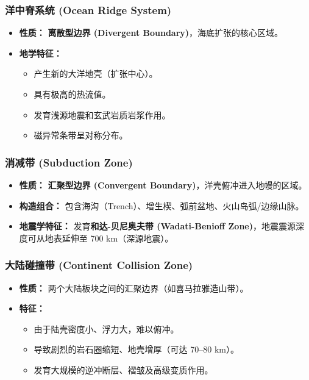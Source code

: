 \documentclass[12pt,a4paper]{article}
\begin{document}
	\subsubsection{洋中脊系统 (Ocean Ridge System)}
	\begin{itemize}
		\item \textbf{性质：} \textbf{离散型边界 (Divergent Boundary)}，海底扩张的核心区域。
		\item \textbf{地学特征：} 
		\begin{itemize}
			\item 产生新的大洋地壳（扩张中心）。
			\item 具有极高的热流值。
			\item 发育浅源地震和玄武岩质岩浆作用。
			\item 磁异常条带呈对称分布。
		\end{itemize}
	\end{itemize}
	
	\subsubsection{消减带 (Subduction Zone)}
	\begin{itemize}
		\item \textbf{性质：} \textbf{汇聚型边界 (Convergent Boundary)}，洋壳俯冲进入地幔的区域。
		\item \textbf{构造组合：} 包含海沟（Trench）、增生楔、弧前盆地、火山岛弧/边缘山脉。
		\item \textbf{地震学特征：} 发育\textbf{和达-贝尼奥夫带 (Wadati-Benioff Zone)}，地震震源深度可从地表延伸至 700 km（深源地震）。
	\end{itemize}
	
	\subsubsection{大陆碰撞带 (Continent Collision Zone)}
	\begin{itemize}
		\item \textbf{性质：} 两个大陆板块之间的汇聚边界（如喜马拉雅造山带）。
		\item \textbf{特征：} 
		\begin{itemize}
			\item 由于陆壳密度小、浮力大，难以俯冲。
			\item 导致剧烈的岩石圈缩短、地壳增厚（可达 70--80 km）。
			\item 发育大规模的逆冲断层、褶皱及高级变质作用。
		\end{itemize}
	\end{itemize}
	
\end{document}
